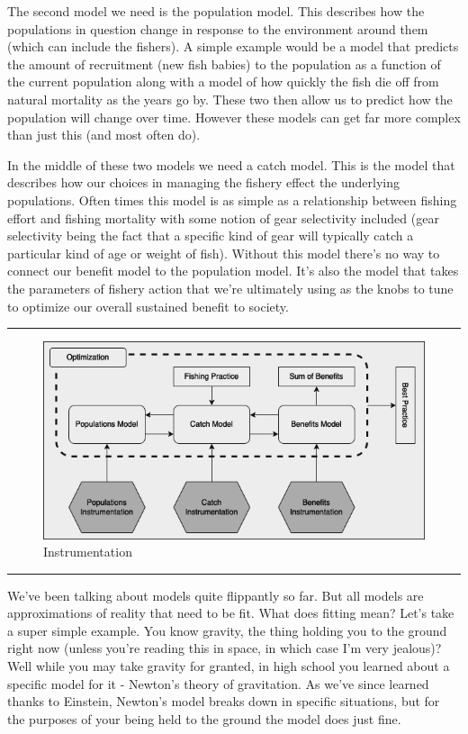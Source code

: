 \documentclass[11pt,a5paper]{book}
\begin{document}
The second model we need is the population model. This describes how the populations in question change in response to the environment around them (which can include the fishers). A simple example would be a model that predicts the amount of recruitment (new fish babies) to the population as a function of the current population along with a model of how quickly the fish die off from natural mortality as the years go by. These two then allow us to predict how the population will change over time. However these models can get far more complex than just this (and most often do). 
\newline

In the middle of these two models we need a catch model. This is the model that describes how our choices in managing the fishery effect the underlying populations. Often times this model is as simple as a relationship between fishing effort and fishing mortality with some notion of gear selectivity included (gear selectivity being the fact that a specific kind of gear will typically catch a particular kind of age or weight of fish). Without this model there's no way to connect our benefit model to the population model. It's also the model that takes the parameters of fishery action that we're ultimately using as the knobs to tune to optimize our overall sustained benefit to society. 
\newpage

\noindent \rule{\textwidth}{0.5pt} 
\begin{figure}[h!] 
  \includegraphics[width=\linewidth]{drawings/high_level_instrumentation.png}
  \caption{Instrumentation}
  \label{fig:high_level_instrumentation}
\end{figure}
\newline
\rule{\textwidth}{0.5pt} 
\vspace{5pt}

We've been talking about models quite flippantly so far. But all models are approximations of reality that need to be fit. What does fitting mean? Let's take a super simple example. You know gravity, the thing holding you to the ground right now (unless you're reading this in space, in which case I'm very jealous)? Well while you may take gravity for granted, in high school you learned about a specific model for it - Newton's theory of gravitation. As we've since learned thanks to Einstein, Newton's model breaks down in specific situations, but for the purposes of your being held to the ground the model does just fine. 
\newline
\end{document}

